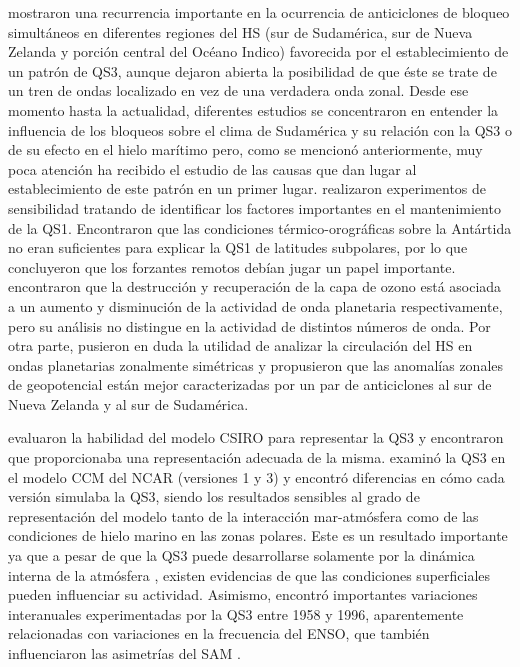 \documentclass[spanish,a4paper,12pt,oneside]{book}
\begin{document}
\citet{Trenberth1985} mostraron una recurrencia importante en la
ocurrencia de anticiclones de bloqueo simultáneos en diferentes regiones
del HS (sur de Sudamérica, sur de Nueva Zelanda y porción central del
Océano Indico) favorecida por el establecimiento de un patrón de QS3,
aunque dejaron abierta la posibilidad de que éste se trate de un tren de
ondas localizado en vez de una verdadera onda zonal. Desde ese momento
hasta la actualidad, diferentes estudios se concentraron en entender la
influencia de los bloqueos sobre el clima de Sudamérica y su relación
con la QS3 \citep[ej.][]{Rao2004} o de su efecto en el hielo marítimo
\citep[ej.][]{Raphael2007} pero, como se mencionó anteriormente, muy
poca atención ha recibido el estudio de las causas que dan lugar al
establecimiento de este patrón en un primer lugar. \citet{Quintanar1995}
realizaron experimentos de sensibilidad tratando de identificar los
factores importantes en el mantenimiento de la QS1. Encontraron que las
condiciones térmico-orográficas sobre la Antártida no eran suficientes
para explicar la QS1 de latitudes subpolares, por lo que concluyeron que
los forzantes remotos debían jugar un papel importante. \citet{Wang2013}
encontraron que la destrucción y recuperación de la capa de ozono está
asociada a un aumento y disminución de la actividad de onda planetaria
respectivamente, pero su análisis no distingue en la actividad de
distintos números de onda. Por otra parte, \citet{Hobbs2010} pusieron en
duda la utilidad de analizar la circulación del HS en ondas planetarias
zonalmente simétricas y propusieron que las anomalías zonales de
geopotencial están mejor caracterizadas por un par de anticiclones al
sur de Nueva Zelanda y al sur de Sudamérica.

\citet{Cai1999} evaluaron la habilidad del modelo CSIRO para representar
la QS3 y encontraron que proporcionaba una representación adecuada de la
misma. \citet{Raphael1998} examinó la QS3 en el modelo CCM del NCAR
(versiones 1 y 3) y encontró diferencias en cómo cada versión simulaba
la QS3, siendo los resultados sensibles al grado de representación del
modelo tanto de la interacción mar-atmósfera como de las condiciones de
hielo marino en las zonas polares. Este es un resultado importante ya
que a pesar de que la QS3 puede desarrollarse solamente por la dinámica
interna de la atmósfera \citep[ej.][]{Simpson2013}, existen evidencias
de que las condiciones superficiales pueden influenciar su actividad.
Asimismo, \citet{Raphael2003} encontró importantes variaciones
interanuales experimentadas por la QS3 entre 1958 y 1996, aparentemente
relacionadas con variaciones en la frecuencia del ENSO, que también
influenciaron las asimetrías del SAM \citep{Fogt2012}.
\end{document}
